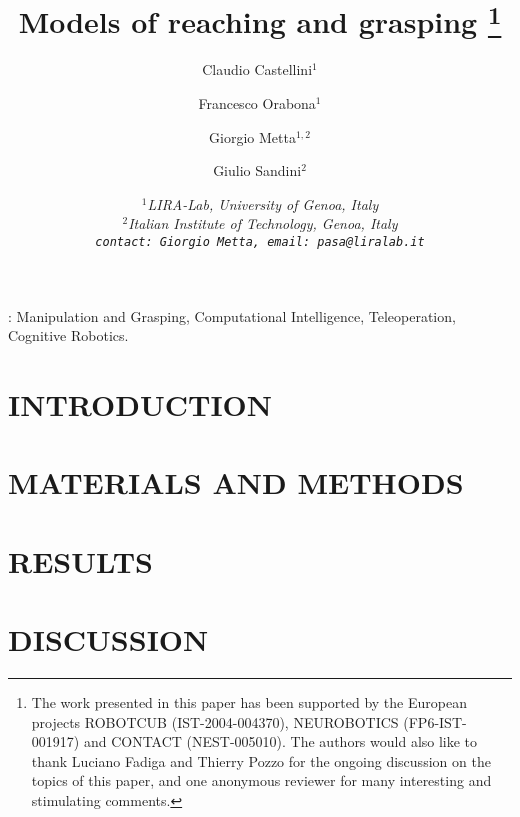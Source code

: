 \documentclass[a4paper]{arsubmit}
\title{Models of reaching and grasping
\footnote{The work presented in this paper has been supported by the
European projects ROBOTCUB (IST-2004-004370), NEUROBOTICS
(FP6-IST-001917) and CONTACT (NEST-005010). The authors would also
like to thank Luciano Fadiga and Thierry Pozzo for the ongoing
discussion on the topics of this paper, and one anonymous reviewer for
many interesting and stimulating comments.}
}
\author{Claudio Castellini$^1$ \and Francesco Orabona$^1$ \and Giorgio
Metta$^{1,2}$ \and Giulio Sandini$^2$}
\date{\small \it{
$^1$LIRA-Lab, University of Genoa, Italy\\
$^2$Italian Institute of Technology, Genoa, Italy\\
{\tt contact: Giorgio Metta, email: pasa@liralab.it}
}}
\begin{document}
\maketitle

\begin{abstract}

\end{abstract}

\vspace{1cm}
:
Manipulation and Grasping,
Computational Intelligence,
Teleoperation,
Cognitive Robotics.

\section{INTRODUCTION}
\label{sec:introduction}


\section{MATERIALS AND METHODS}
\label{sec:exp_desc}


\section{RESULTS}
\label{sec:exp_res}


\section{DISCUSSION}
\label{sec:Conclusions}


{\small


}
\end{document}
